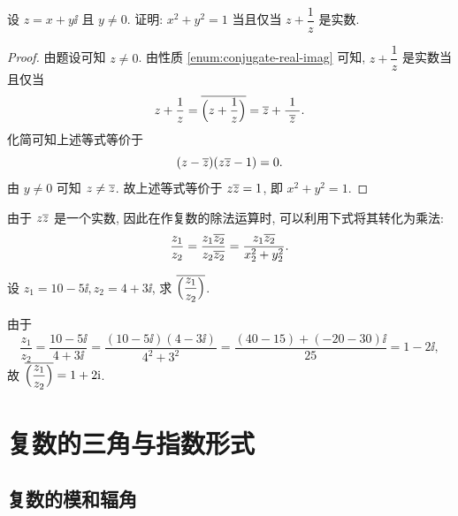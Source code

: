 \begin{example}
  设 $z=x+y\ii$ 且 $y\neq 0$. 证明: $x^2+y^2=1$ 当且仅当 $z+\dfrac1z$ 是实数.
\end{example}
\begin{proof}
  由题设可知 $z\neq 0$.
  由性质 \ref{enum:conjugate-real-imag} 可知, 
  $z+\dfrac1z$ 是实数当且仅当
  \[
     z+\frac1z
    =\overline{\Bigl(z+\frac1z\Bigr)}
    =\overline z+\frac1{~\overline z~}.
  \]
  化简可知上述等式等价于
  \[
    (z-\overline z)(z\overline z-1)=0.
  \]
  由 $y\neq0$ 可知 $z\neq \overline z$.
  故上述等式等价于 $z\overline z=1$, 即 $x^2+y^2=1$.
\end{proof}

由于 $z\overline z$ 是一个实数,
因此在作复数的除法运算时, 可以利用下式将其转化为乘法:
\[
   \frac{z_1}{z_2}
  =\frac{z_1\overline{z_2}}{z_2\overline{z_2}}
  =\frac{z_1\overline{z_2}}{x_2^2+y_2^2}.
\]

\begin{example}
  设 $z_1=10-5\ii,z_2=4+3\ii$, 求 $\overline{\Bigl(\dfrac{z_1}{z_2}\Bigr)}$.
\end{example}

\begin{solution}
  由于
  \[
     \frac{z_1}{z_2}
    =\frac{10-5\ii}{4+3\ii}
    =\frac{(10-5\ii)(4-3\ii)}{4^2+3^2}
    =\frac{(40-15)+(-20-30)\ii}{25}
    =1-2\ii,
  \]
  故 $\overline{\Bigl(\dfrac{z_1}{z_2}\Bigr)}=1+2\mathrm{i}$.
\end{solution}



\section{复数的三角与指数形式}

\subsection{复数的模和辐角}

